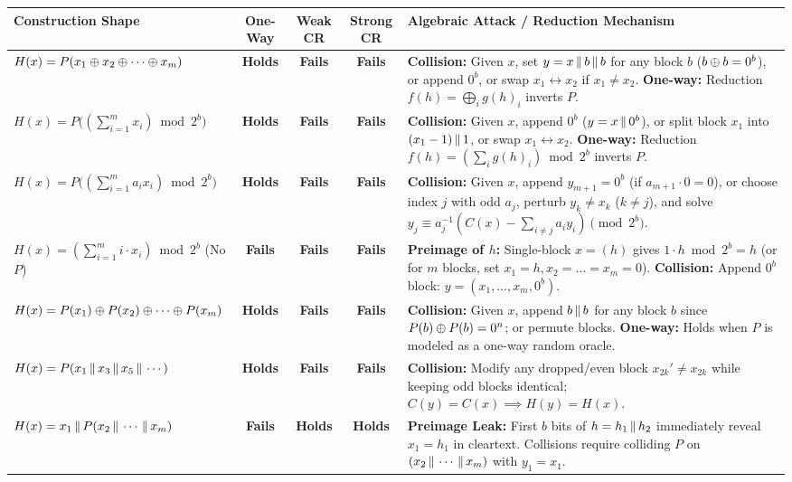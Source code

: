 \begin{table}[h!]
\centering
\footnotesize
\begin{tabularx}{\textwidth}{@{}L{4.3cm} c c c Y@{}}
\toprule
\textbf{Construction Shape} & \textbf{One-Way} & \textbf{Weak CR} & \textbf{Strong CR} & \textbf{Algebraic Attack / Reduction Mechanism} \\
\midrule
$H(x) = P(x_1 \oplus x_2 \oplus \cdots \oplus x_m)$ & \textbf{Holds} & \textbf{Fails} & \textbf{Fails} & \textbf{Collision:} Given $x$, set $y = x \,\|\, b \,\|\, b$ for any block $b$ ($b \oplus b = 0^b$), or append $0^b$, or swap $x_1 \leftrightarrow x_2$ if $x_1 \neq x_2$. \textbf{One-way:} Reduction $f(h) = \bigoplus_{i} g(h)_i$ inverts $P$. \\
$H(x) = P\big((\sum_{i=1}^m x_i) \bmod 2^b\big)$ & \textbf{Holds} & \textbf{Fails} & \textbf{Fails} & \textbf{Collision:} Given $x$, append $0^b$ ($y = x \,\|\, 0^b$), or split block $x_1$ into $(x_1 - 1) \,\|\, 1$, or swap $x_1 \leftrightarrow x_2$. \textbf{One-way:} Reduction $f(h) = (\sum_i g(h)_i) \bmod 2^b$ inverts $P$. \\
$H(x) = P\big((\sum_{i=1}^m a_i x_i) \bmod 2^b\big)$ & \textbf{Holds} & \textbf{Fails} & \textbf{Fails} & \textbf{Collision:} Given $x$, append $y_{m+1} = 0^b$ (if $a_{m+1} \cdot 0 = 0$), or choose index $j$ with odd $a_j$, perturb $y_k \neq x_k$ ($k \neq j$), and solve $y_j \equiv a_j^{-1}(C(x) - \sum_{i \neq j} a_i y_i) \pmod{2^b}$. \\
$H(x) = (\sum_{i=1}^m i \cdot x_i) \bmod 2^b$ (No $P$) & \textbf{Fails} & \textbf{Fails} & \textbf{Fails} & \textbf{Preimage of $h$:} Single-block $x = (h)$ gives $1 \cdot h \bmod 2^b = h$ (or for $m$ blocks, set $x_1 = h, x_2=\dots=x_m=0$). \textbf{Collision:} Append $0^b$ block: $y = (x_1, \dots, x_m, 0^b)$. \\
$H(x) = P(x_1) \oplus P(x_2) \oplus \cdots \oplus P(x_m)$ & \textbf{Holds} & \textbf{Fails} & \textbf{Fails} & \textbf{Collision:} Given $x$, append $b \,\|\, b$ for any block $b$ since $P(b) \oplus P(b) = 0^n$; or permute blocks. \textbf{One-way:} Holds when $P$ is modeled as a one-way random oracle. \\
$H(x) = P(x_1 \,\|\, x_3 \,\|\, x_5 \,\|\, \cdots)$ & \textbf{Holds} & \textbf{Fails} & \textbf{Fails} & \textbf{Collision:} Modify any dropped/even block $x_{2k}' \neq x_{2k}$ while keeping odd blocks identical; $C(y) = C(x) \implies H(y) = H(x)$. \\
$H(x) = x_1 \,\|\, P(x_2 \,\|\, \cdots \,\|\, x_m)$ & \textbf{Fails} & \textbf{Holds} & \textbf{Holds} & \textbf{Preimage Leak:} First $b$ bits of $h = h_1 \,\|\, h_2$ immediately reveal $x_1 = h_1$ in cleartext. Collisions require colliding $P$ on $(x_2 \,\|\, \cdots \,\|\, x_m)$ with $y_1 = x_1$. \\

\end{tabularx}
\end{table}
